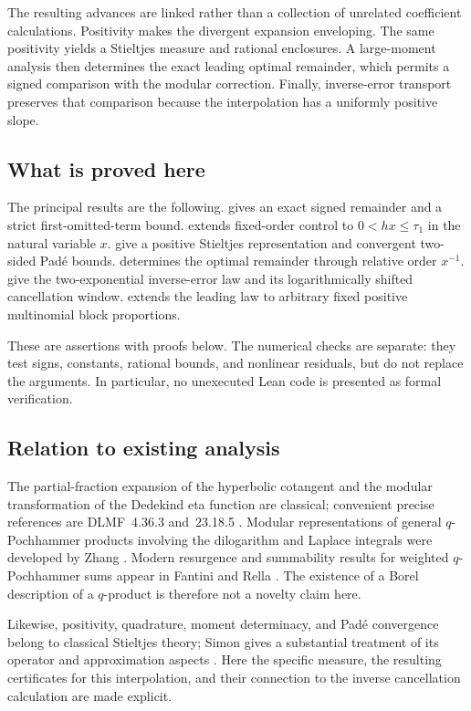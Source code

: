 \documentclass[11pt,a4paper]{article}
\numberwithin{equation}{section}
\theoremstyle{plain}
\theoremstyle{definition}
\theoremstyle{remark}
\begin{document}
The resulting advances are linked rather than a collection of unrelated
coefficient calculations. Positivity makes the divergent expansion enveloping.
The same positivity yields a Stieltjes measure and rational enclosures. A
large-moment analysis then determines the exact leading optimal remainder,
which permits a signed comparison with the modular correction. Finally,
inverse-error transport preserves that comparison because the interpolation
has a uniformly positive slope.

\subsection{What is proved here}
The principal results are the following.  gives an exact
signed remainder and a strict first-omitted-term bound. 
extends fixed-order control to $0<hx\le\tau_1$ in the natural variable $x$.
 give a positive Stieltjes representation and
convergent two-sided Pad\'e bounds.  determines the optimal
remainder through relative order $x^{-1}$. 
give the two-exponential inverse-error law and its logarithmically shifted
cancellation window.  extends the leading law to arbitrary
fixed positive multinomial block proportions.

These are assertions with proofs below. The numerical checks are separate:
they test signs, constants, rational bounds, and nonlinear residuals, but do not
replace the arguments. In particular, no unexecuted Lean code is presented as
formal verification.

\subsection{Relation to existing analysis}
The partial-fraction expansion of the hyperbolic cotangent and the modular
transformation of the Dedekind eta function are classical; convenient precise
references are DLMF~4.36.3 and~23.18.5 \cite{dlmf-hyper,dlmf-eta}. Modular
representations of general $q$-Pochhammer products involving the dilogarithm
and Laplace integrals were developed by Zhang \cite{zhang}. Modern resurgence
and summability results for weighted $q$-Pochhammer sums appear in Fantini and
Rella \cite{fantini-rella}. The existence of a Borel description of a
$q$-product is therefore not a novelty claim here.

Likewise, positivity, quadrature, moment determinacy, and Pad\'e convergence
belong to classical Stieltjes theory; Simon gives a substantial treatment of
its operator and approximation aspects \cite{simon}. Here the specific
measure, the resulting certificates for this interpolation, and their
connection to the inverse cancellation calculation are made explicit.
\end{document}
